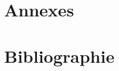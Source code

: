\chapter{Annexes}


\listoffigures
\listoftables
\chapter{Bibliographie}
\nocite{*}
\printbibliography